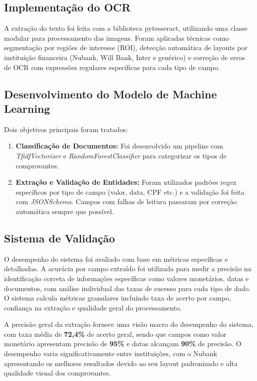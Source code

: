 \subsection{Implementação do OCR}

A extração do texto foi feita com a biblioteca pytesseract, utilizando uma classe modular para processamento das imagens. Foram aplicadas técnicas como segmentação por regiões de interesse (ROI), detecção automática de layouts por instituição financeira (Nubank, Will Bank, Inter e genérico) e correção de erros de OCR com expressões regulares específicas para cada tipo de campo.

\subsection{Desenvolvimento do Modelo de Machine Learning}

Dois objetivos principais foram tratados:

\begin{enumerate}[label=\alph*)]
    \item \textbf{Classificação de Documentos:} Foi desenvolvido um pipeline com \textit{TfidfVectorizer} e \textit{RandomForestClassifier} para categorizar os tipos de comprovantes.
    \item \textbf{Extração e Validação de Entidades:} Foram utilizados padrões regex específicos por tipo de campo (valor, data, CPF etc.) e a validação foi feita com \textit{JSONSchema}. Campos com falhas de leitura passaram por correção automática sempre que possível.
\end{enumerate}

\subsection{Sistema de Validação}

O desempenho do sistema foi avaliado com base em métricas específicas e detalhadas. A acurácia por campo extraído foi utilizada para medir a precisão na identificação correta de informações específicas como valores monetários, datas e documentos, com análise individual das taxas de sucesso para cada tipo de dado. O sistema calcula métricas granulares incluindo taxa de acerto por campo, confiança na extração e qualidade geral do processamento.

A precisão geral da extração fornece uma visão macro do desempenho do sistema, com taxa média de \textbf{72,4\%} de acerto geral, sendo que campos como valor monetário apresentam precisão de \textbf{95\%} e datas alcançam \textbf{90\%} de precisão. O desempenho varia significativamente entre instituições, com o Nubank apresentando os melhores resultados devido ao seu layout padronizado e alta qualidade visual dos comprovantes.

